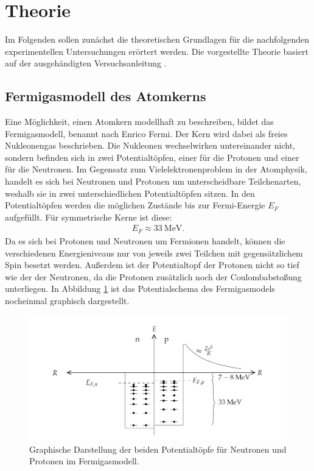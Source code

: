 \section{Theorie}
	
Im Folgenden sollen zunächst die theoretischen Grundlagen für die nachfolgenden experimentellen Untersuchungen erörtert werden.
Die vorgestellte Theorie basiert auf der ausgehändigten Versuchsanleitung \cite{wwu}.

\subsection{Fermigasmodell des Atomkerns}
Eine Möglichkeit, einen Atomkern modellhaft zu beschreiben, bildet das Fermigasmodell, benannt nach Enrico Fermi.
Der Kern wird dabei als freies Nukleonengas beschrieben.
Die Nukleonen wechselwirken untereinander nicht, sondern befinden sich in zwei Potentialtöpfen, einer für die Protonen und einer für die Neutronen.
Im Gegensatz zum Vielelektronenproblem in der Atomphysik, handelt es sich bei Neutronen und Protonen um unterscheidbare Teilchenarten, weshalb sie in zwei unterschiedlichen Potentialtöpfen sitzen.
In den Potentialtöpfen werden die möglichen Zustände bis zur Fermi-Energie $E_F$ aufgefüllt.
Für symmetrische Kerne ist diese:
\begin{align*}
E_F\approx \SI{33}{\mega\electronvolt}.
\end{align*}
Da es sich bei Protonen und Neutronen um Fermionen handelt, können die verschiedenen Energieniveaus nur von jeweils zwei Teilchen mit gegensätzlichem Spin besetzt werden.
Außerdem ist der Potentialtopf der Protonen nicht so tief wie der der Neutronen, da die Protonen zusätzlich noch der Coulombabstoßung unterliegen.
In Abbildung \ref{fermigas} ist das Potentialschema des Fermigasmodels nocheinmal graphisch dargestellt.

\begin{figure}[h]
	\centering
	\includegraphics[width=1.0\textwidth]{img/fermigas}
	\caption{Graphische Darstellung der beiden Potentialtöpfe für Neutronen und Protonen im Fermigasmodell. \cite{fermi}}
	\label{fermigas}
\end{figure}

